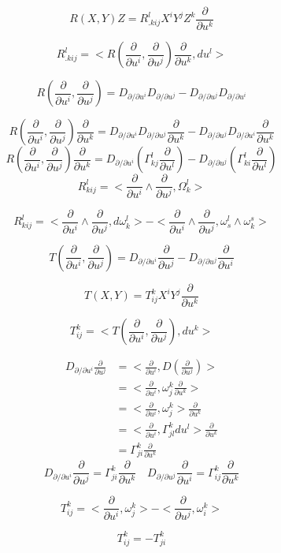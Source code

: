 \documentclass[12pt,a4paper]{article}
\begin{document}
\[
R(X,Y)Z = R^l_{.kij}X^iY^jZ^k\frac{\partial}{\partial u^k}
\]

\[
R^l_{.kij} = <R \left( \frac{\partial}{\partial u^i},\frac{\partial}{\partial u^j}\right) \frac{\partial}{\partial u^k}, du^l>
\]

\[
R \left( \frac{\partial}{\partial u^i},\frac{\partial}{\partial u^j}\right) = D_{\partial/\partial u^i}D_{\partial/\partial u^j} - D_{\partial/\partial u^j}D_{\partial/\partial u^i}
\]

\[
R \left( \frac{\partial}{\partial u^i},\frac{\partial}{\partial u^j}\right) \frac{\partial}{\partial u^k} = D_{{\partial}/{\partial u^i}}D_{\partial/\partial u^j}\frac{\partial}{\partial u^k} - D_{{\partial}/{\partial u^j}}D_{\partial/\partial u^i}\frac{\partial}{\partial u^k}
\]
\[
R \left( \frac{\partial}{\partial u^i},\frac{\partial}{\partial u^j}\right) \frac{\partial}{\partial u^k} = 
D_{{\partial}/{\partial u^i}}(\Gamma^l_{kj}\frac{\partial}{\partial u^l}) - D_{{\partial}/{\partial u^j}}(\Gamma^l_{ki}\frac{\partial}{\partial u^l})
\]
\[
R^l_{kij} = <\frac{\partial}{\partial u^i}\wedge\frac{\partial}{\partial u^j},\Omega^l_k>
\]

\[
R^l_{kij} = <\frac{\partial}{\partial u^i}\wedge\frac{\partial}{\partial u^j},d\omega^l_k> -   <\frac{\partial}{\partial u^i}\wedge\frac{\partial}{\partial u^j},\omega^l_s \wedge \omega^s_k>
\]

\[
 T \left( \frac{\partial}{\partial u^i},\frac{\partial}{\partial u^j}\right) =  D_{\partial/\partial u^i}\frac{\partial}{\partial u^j} - D_{\partial/\partial u^j}\frac{\partial}{\partial u^i}
\]

\[
T(X,Y) = T^k_{ij}X^iY^j\frac{\partial}{\partial u^k}
\]

\[
T^k_{ij} = <T\left( \frac{\partial}{\partial u^i},\frac{\partial}{\partial u^j}\right),du^k>
\]

\begin{align*}
  D_{\partial/\partial u^i}\frac{\partial}{\partial u^j} & = <\frac{\partial}{\partial u^i} ,D(\frac{\partial}{\partial u^j}) > \\
														   & = <\frac{\partial}{\partial u^i} ,\omega^k_j\frac{\partial}{\partial u^k} > \\
														   & = <\frac{\partial}{\partial u^i} ,\omega^k_j > \frac{\partial}{\partial u^k}\\
														   & = <\frac{\partial}{\partial u^i} ,\Gamma^k_{jl}du^l > \frac{\partial}{\partial u^k}\\
														   & = \Gamma^k_{ji} \frac{\partial}{\partial u^k}
\end{align*}
\[
 D_{\partial/\partial u^i}\frac{\partial}{\partial u^j} = \Gamma^k_{ji} \frac{\partial}{\partial u^k}\quad D_{\partial/\partial u^j}\frac{\partial}{\partial u^i} = \Gamma^k_{ij} \frac{\partial}{\partial u^k}
\]

\[
T^k_{ij} =<\frac{\partial}{\partial u^i} ,\omega^k_j > - <\frac{\partial}{\partial u^j} ,\omega^k_i >
\]

\[
T^k_{ij} = -T^k_{ji}
\]
\end{document}
